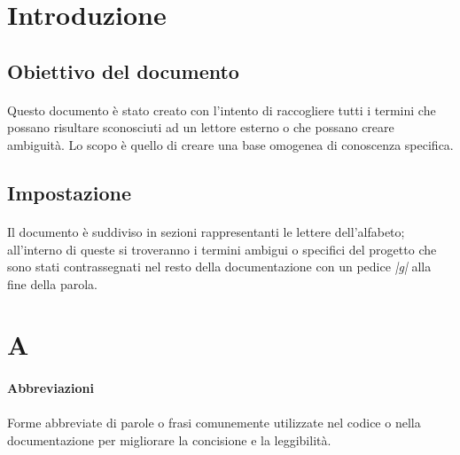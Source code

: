 \documentclass[10pt, a4paper]{article}
\title{\titolo}
\author{SWEetCode}
\begin{document}



\newpage

\tableofcontents
\newpage

\section{Introduzione}
\subsection{Obiettivo del documento}
\paragraph{}Questo documento è stato creato con l'intento di raccogliere tutti i termini che possano risultare sconosciuti ad un lettore esterno o che possano creare ambiguità. Lo scopo è quello di creare una base omogenea di conoscenza specifica. 

\subsection{Impostazione}
\paragraph{}Il documento è suddiviso in sezioni rappresentanti le lettere dell'alfabeto;
all'interno di queste si troveranno i termini ambigui o specifici del progetto che sono stati contrassegnati nel resto della documentazione con un pedice \textit{|g|} alla fine della parola.

\newpage
\vspace{2em}
\section{A}
\vspace{2em}
\paragraph{Abbreviazioni}\noindent\hrulefill
\paragraph{}Forme abbreviate di parole o frasi comunemente utilizzate nel codice o nella documentazione per migliorare la concisione e la leggibilità.
\end{document}
